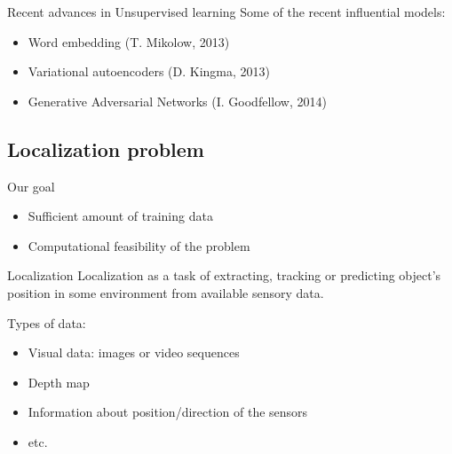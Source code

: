 \documentclass[pdftex, handout]{beamer}
\begin{document}
\begin{frame}{Recent advances in Unsupervised learning}
  Some of the recent influential models:
  \begin{itemize}
    \item Word embedding (T. Mikolow, 2013)
    \item Variational autoencoders (D. Kingma, 2013)
    \item Generative Adversarial Networks (I. Goodfellow, 2014)
  \end{itemize}
\end{frame}


\subsection{Localization problem}

\begin{frame}{Our goal}
  \begin{itemize}
    \item Sufficient amount of training data
  \end{itemize}
  \begin{itemize}
    \item Computational feasibility of the problem
  \end{itemize}
\end{frame}




\begin{frame}{Localization}
  Localization as a task of extracting, tracking or predicting object's position in some environment from available sensory data.

  \pause
\vspace{1cm}
  Types of data:
  \begin{itemize}
    \item Visual data: images or video sequences
    \item Depth map
    \item Information about position/direction of the sensors
    \item etc.
  \end{itemize}
\end{frame}
\end{document}
